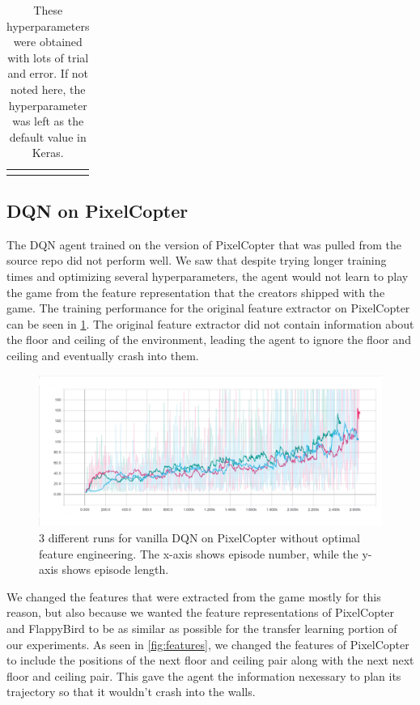 \documentclass{article}
\begin{document}
\begin{table}[h!]
\begin{tabular}{ll}
\\
\\

\end{tabular}
\caption{These hyperparameters were obtained with lots of trial and error. If not noted here, the hyperparameter was left as the default value in Keras.}
\label{hyperparams-xavier}
\end{table}

\subsection{DQN on PixelCopter}

The DQN agent trained on the version of PixelCopter that was pulled from the source repo did not perform well.
We saw that despite trying longer training times and optimizing several hyperparameters, the agent would not learn to play the game from the feature representation that the creators shipped with the game.
The training performance for the original feature extractor on PixelCopter can be seen in \ref{fig:other-training}.
The original feature extractor did not contain information about the floor and ceiling of the environment, leading the agent to ignore the floor and ceiling and eventually crash into them.

\begin{figure}[h!]
\includegraphics[width=\textwidth]{pixelcopter-training}
\caption{3 different runs for vanilla DQN on PixelCopter without optimal feature engineering. The x-axis shows episode number, while the y-axis shows episode length.}
\label{fig:other-training}
\end{figure}

We changed the features that were extracted from the game mostly for this reason, but also because we wanted the feature representations of PixelCopter and FlappyBird to be as similar as possible for the transfer learning portion of our experiments.
As seen in \ref{fig:features}, we changed the features of PixelCopter to include the positions of the next floor and ceiling pair along with the next next floor and ceiling pair.
This gave the agent the information nexessary to plan its trajectory so that it wouldn't crash into the walls.
\end{document}
